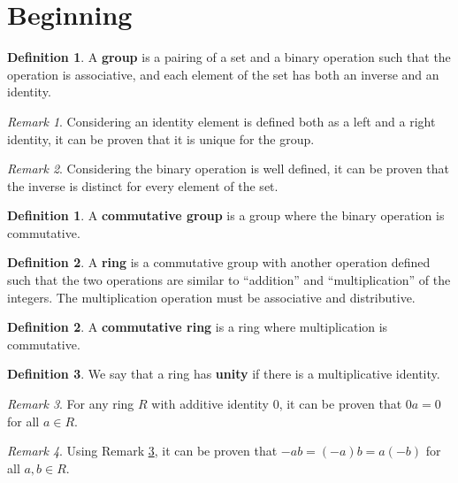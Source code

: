 \documentclass[11pt]{article}
\theoremstyle{definition}
\newtheorem{definition}{Definition}[section]
\newtheorem{subdefinition}{Definition}[definition]
\theoremstyle{remark}
\newtheorem{remark}{Remark}[definition]
\begin{document}
\section{Beginning}


\begin{definition}
    A \textbf{group} is a pairing of a set and a binary operation such that the
    operation is associative, and each element of the set has both an inverse
    and an identity.
\end{definition}

\begin{remark}
    Considering an identity element is defined both as a left and a right
    identity, it can be proven that it is unique for the group.
\end{remark}

\begin{remark}
    Considering the binary operation is well defined, it can be proven that the
    inverse is distinct for every element of the set.
\end{remark}

\begin{subdefinition}
    A \textbf{commutative group} is a group where the binary operation is
    commutative.
\end{subdefinition}


\begin{definition}
    A \textbf{ring} is a commutative group with another operation defined such
    that the two operations are similar to ``addition'' and ``multiplication''
    of the integers.
    The multiplication operation must be associative and distributive.
\end{definition}

\begin{subdefinition}
    A \textbf{commutative ring} is a ring where multiplication is commutative.
\end{subdefinition}

\begin{subdefinition}
    We say that a ring has \textbf{unity} if there is a multiplicative identity.
\end{subdefinition}

\begin{remark}
    \label{rem:zero multiply}
    For any ring $R$ with additive identity 0, it can be proven that $0a=0$ for
    all $a\in R$.
\end{remark}

\begin{remark}
    Using Remark \ref{rem:zero multiply}, it can be proven that
    $-ab=(-a)b=a(-b)$ for all $a,b\in R$.
\end{remark}
\end{document}
